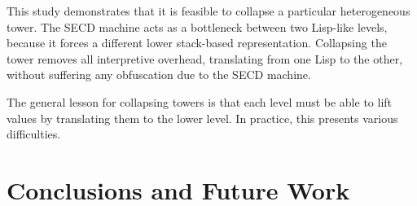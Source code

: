 \documentclass[sigplan,anonymous,review]{acmart}
\theoremstyle{definition}
\begin{document}
This study demonstrates that it is feasible to collapse a particular
heterogeneous tower. The SECD machine acts as a bottleneck
between two Lisp-like levels, because it forces a different lower
stack-based representation. Collapsing the tower removes
all interpretive overhead, translating from one Lisp to the other,
without suffering any obfuscation due to the SECD machine.

The general lesson for collapsing towers is that each level must be
able to lift values by translating them to the lower level. In
practice, this presents various difficulties.

\section{Conclusions and Future Work}\label{sec:conc}

\end{document}
